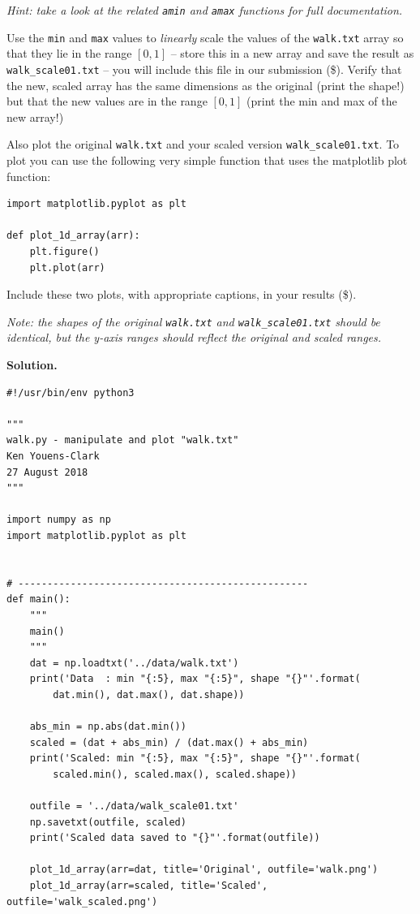 \documentclass[10pt]{article}
\begin{document}
\begin{enumerate}
{\em Hint: take a look at the related {\tt amin} and {\tt amax} functions for full documentation.}

Use the {\tt min} and {\tt max} values to {\em linearly} scale the values of the {\tt walk.txt} array so that they lie in the range $[0, 1]$ -- store this in a new array and save the result as {\tt walk\_scale01.txt} -- you will include this file in our submission (\$).  Verify that the new, scaled array has the same dimensions as the original (print the shape!) but that the new values are in the range $[0, 1]$ (print the min and max of the new array!) 

Also plot the original {\tt walk.txt} and your scaled version {\tt walk\_scale01.txt}.  To plot you can use the following very simple function that uses the matplotlib plot function:
\begin{verbatim}
import matplotlib.pyplot as plt

def plot_1d_array(arr):
    plt.figure()
    plt.plot(arr)
\end{verbatim}
Include these two plots, with appropriate captions, in your results (\$).

{\em Note: the shapes of the original {\tt walk.txt} and {\tt walk\_scale01.txt} should be identical, but the y-axis ranges should reflect the original and scaled ranges.}

{\bf Solution.} 

\begin{verbatim}
#!/usr/bin/env python3

"""
walk.py - manipulate and plot "walk.txt"
Ken Youens-Clark
27 August 2018
"""

import numpy as np
import matplotlib.pyplot as plt


# --------------------------------------------------
def main():
    """
    main()
    """
    dat = np.loadtxt('../data/walk.txt')
    print('Data  : min "{:5}, max "{:5}", shape "{}"'.format(
        dat.min(), dat.max(), dat.shape))

    abs_min = np.abs(dat.min())
    scaled = (dat + abs_min) / (dat.max() + abs_min)
    print('Scaled: min "{:5}, max "{:5}", shape "{}"'.format(
        scaled.min(), scaled.max(), scaled.shape))

    outfile = '../data/walk_scale01.txt'
    np.savetxt(outfile, scaled)
    print('Scaled data saved to "{}"'.format(outfile))

    plot_1d_array(arr=dat, title='Original', outfile='walk.png')
    plot_1d_array(arr=scaled, title='Scaled', outfile='walk_scaled.png')



\end{verbatim}
\end{enumerate}
\end{document}
